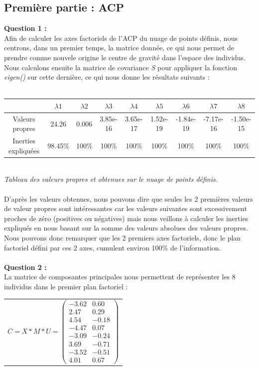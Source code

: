 \documentclass[a4paper, 10pt]{article}
\begin{document}
\subsection*{Première partie : ACP}
\textbf{Question 1 :}\\
Afin de calculer les axes factoriels de l'ACP du nuage de points définis, nous centrons, dans un premier temps, la matrice donnée,
ce qui nous permet de prendre comme nouvele origine le centre de gravité dans l'espace des individus.\\
Nous calculons ensuite la matrice de covariance \textit{S} pour appliquer la fonction \textit{eigen()} sur cette dernière,
ce qui nous donne les résultats suivants :\\ \\
\begin{tabular}{|c|c|c|c|c|c|c|c|c|}
\hline
 & $\lambda1$ & $\lambda2$ & $\lambda3$ & $\lambda4$ & $\lambda5$ & $\lambda6$ & $\lambda7$ & $\lambda8$ \\
\hline
Valeurs propres & 24.26 & 0.006 & 3.85e-16 & 3.65e-17 & 1.52e-19 & -1.84e-19 & -7.17e-16 & -1.50e-15 \\
\hline
Inerties expliquées & 98.45\% & 100\% & 100\% & 100\% & 100\% & 100\% & 100\% & 100\% \\
\hline
\end{tabular}\\
\textit{Tableau des valeurs propres et obtenues sur le nuage de points définis.}\\ \\
D'après les valeurs obtenues, nous pouvons dire que seules les 2 premières valeurs de valeur propres sont intéressantes car les valeurs
suivantes sont excessivement proches de zéro (positives ou négatives) mais nous veillons à calculer les inerties expliqués en nous
basant sur la somme des valeurs absolues des valeurs propres.\\
Nous pouvons donc remarquer que les 2 premiers axes factoriels, donc le plan factoriel défini par ces 2 axes,
cumulent environ 100\% de l'information.\\ \\
\textbf{Question 2 :}\\
La matrice de composantes principales nous permettent de représenter les 8 individus dans le premier plan factoriel :\\
\hspace*{0.5cm}
\begin{tabular}{c}
$C = X * M * U =
\begin{pmatrix}
-3.62 & 0.60 \\
2.47 & 0.29 \\
4.54 & -0.18 \\
-4.47 & 0.07 \\
-3.09 & -0.24 \\
3.69 & -0.71 \\
-3.52 & -0.51 \\
4.01 & 0.67
\end{pmatrix}$\\
\end{tabular}
\end{document}
